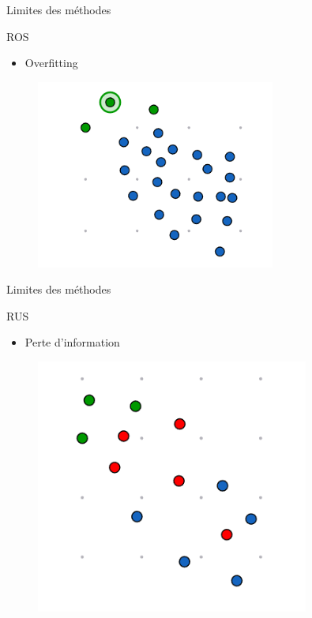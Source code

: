 \documentclass{beamer}
\begin{document}
\begin{frame}{Limites des méthodes}
\begin{block}{ROS}
    \begin{itemize}
       \item Overfitting
   \end{itemize}
\end{block}
    \begin{figure}
    \centering
    \includegraphics[width=0.7\textwidth]{images/lROS.png}

\end{figure}
\end{frame}

\begin{frame}{Limites des méthodes}
\begin{block}{RUS}
    \begin{itemize}
    \item Perte d'information
   \end{itemize}
\end{block}
    \begin{figure}
    \centering
    \includegraphics[width=0.8\textwidth]{images/lrus.png}

\end{figure}
\end{frame}
\end{document}
